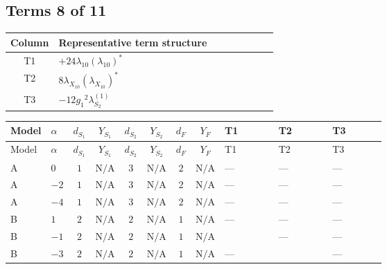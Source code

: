 \documentclass[8pt]{article}
\begin{document}
\begin{landscape}
\subsection*{Terms 8 of 11}
\begin{center}
\begin{tabular}{@{}c >{\raggedright\arraybackslash}p{0.82\linewidth}@{}}
\toprule
Column & Representative term structure \\
\midrule
T1 & \(\displaystyle +24 {\lambda_{10}} \left({\lambda_{10}}\right)^{*}\) \\
\midrule
T2 & \(\displaystyle 8 {\lambda_{X_{10}}} \left({\lambda_{X_{10}}}\right)^{*}\) \\
\midrule
T3 & \(\displaystyle -12 {g_1}^2 {\lambda_{S_2}^{(1)}}\) \\
\midrule
\bottomrule
\end{tabular}
\end{center}
\smallskip
\tiny
\begin{longtable}{@{}llcccccc >{\raggedright\arraybackslash}p{0.21\linewidth} >{\raggedright\arraybackslash}p{0.21\linewidth} >{\raggedright\arraybackslash}p{0.21\linewidth}@{}}
\toprule
Model & $\alpha$ & $d_{S_1}$ & $Y_{S_1}$ & $d_{S_2}$ & $Y_{S_2}$ & $d_F$ & $Y_F$ & T1 & T2 & T3 \\
\midrule
\endfirsthead
\toprule
Model & $\alpha$ & $d_{S_1}$ & $Y_{S_1}$ & $d_{S_2}$ & $Y_{S_2}$ & $d_F$ & $Y_F$ & T1 & T2 & T3 \\
\midrule
\endhead
A & $0$ & $1$ & $\text{N/A}$ & $3$ & $\text{N/A}$ & $2$ & $\text{N/A}$ & --- & --- & --- \\
\midrule
A & $-2$ & $1$ & $\text{N/A}$ & $3$ & $\text{N/A}$ & $2$ & $\text{N/A}$ & --- & --- & --- \\
\midrule
A & $-4$ & $1$ & $\text{N/A}$ & $3$ & $\text{N/A}$ & $2$ & $\text{N/A}$ & --- & --- & --- \\
\midrule
B & $1$ & $2$ & $\text{N/A}$ & $2$ & $\text{N/A}$ & $1$ & $\text{N/A}$ & --- & --- & --- \\
\midrule
B & $-1$ & $2$ & $\text{N/A}$ & $2$ & $\text{N/A}$ & $1$ & $\text{N/A}$ & \scriptsize\adjustbox{max width=\linewidth}{$\begin{gathered} +24 {\lambda_{10}} \left({\lambda_{10}}\right)^{*}\end{gathered}$} & --- & --- \\
\midrule
B & $-3$ & $2$ & $\text{N/A}$ & $2$ & $\text{N/A}$ & $1$ & $\text{N/A}$ & --- & \scriptsize\adjustbox{max width=\linewidth}{$\begin{gathered} 8 {\lambda_{X_{10}}} \left({\lambda_{X_{10}}}\right)^{*}\end{gathered}$} & --- \\

\end{longtable}
\end{landscape}
\end{document}
